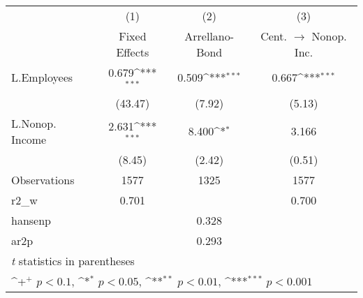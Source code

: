 {
\def\sym#1{\ifmmode^{#1}\else\(^{#1}\)\fi}
\begin{tabular}{l*{3}{c}}
\hline\hline
                    &\multicolumn{1}{c}{(1)}&\multicolumn{1}{c}{(2)}&\multicolumn{1}{c}{(3)}\\
                    &\multicolumn{1}{c}{Fixed Effects}&\multicolumn{1}{c}{Arrellano-Bond}&\multicolumn{1}{c}{Cent. $\rightarrow$ Nonop. Inc.}\\
\hline
L.Employees         &       0.679\sym{***}&       0.509\sym{***}&       0.667\sym{***}\\
                    &     (43.47)         &      (7.92)         &      (5.13)         \\
L.Nonop. Income     &       2.631\sym{***}&       8.400\sym{*}  &       3.166         \\
                    &      (8.45)         &      (2.42)         &      (0.51)         \\
\hline
Observations        &        1577         &        1325         &        1577         \\
r2\_w                &       0.701         &                     &       0.700         \\
hansenp             &                     &       0.328         &                     \\
ar2p                &                     &       0.293         &                     \\
\hline\hline
\multicolumn{4}{l}{\footnotesize \textit{t} statistics in parentheses}\\
\multicolumn{4}{l}{\footnotesize \sym{+} \(p<0.1\), \sym{*} \(p<0.05\), \sym{**} \(p<0.01\), \sym{***} \(p<0.001\)}\\
\end{tabular}
}
